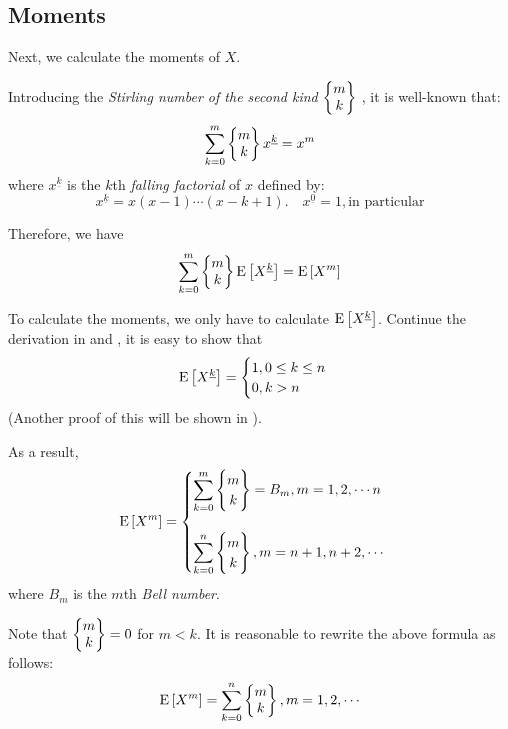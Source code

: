 \subsection{Moments}
\label{sec:moments}
Next, we calculate the moments of $ X$.

Introducing the \emph{Stirling number of the second kind}\cite{wiki_stir}  $ \left\{\begin{matrix}m\\k\end{matrix}\right\} $ , it is well-known that:
\[ \sum_{k=0}^m\Stir{m}{k}x^{\underline{k}} = x^m\]
where $ x^{\underline{k}}$ is the $ k$th \emph{falling factorial} of $ x$ defined by:
\[ x^{\underline{k}} = x(x-1)\cdots (x-k+1). \quad x^{\underline{0}} = 1, \text{in particular}\]

Therefore, we have
\[ \sum_{k=0}^m\Stir{m}{k}\E{X^{\underline{k}}} = \E{X^m}\]

To calculate the moments, we only have to calculate $ \text{E}\left[X^{\underline{k}}\right]$.
Continue the derivation in  and , it is easy to show that
\[ \text{E}\left[X^{\underline{k}}\right] =\begin{cases} 1, 0\le k\le n\\
0,  k>n\end{cases} \]
(Another proof of this
will be shown in ).

As a result,
 \begin{equation*}
 \E{X^m} =\begin{cases} \sum_{k=0}^m\Stir{m}{k} = B_m, m = 1,2,\cdots n \\
   \\
  \sum_{k=0}^n\Stir{m}{k}, m  = n+1, n+2,\cdots \end{cases}
  \end{equation*}
where $ B_m$ is the $ m$th \emph{Bell number}\cite{wiki_bell}.

Note that $ \left\{\begin{matrix}m\\k\end{matrix}\right\} = 0$ for $ m < k$. It is reasonable to rewrite the above formula as follows:
\begin{equation}
  \E{X^m} = \sum_{k=0}^n\Stir{m}{k}, m=1,2,\cdots
  \label{eqn:moments}
\end{equation}

